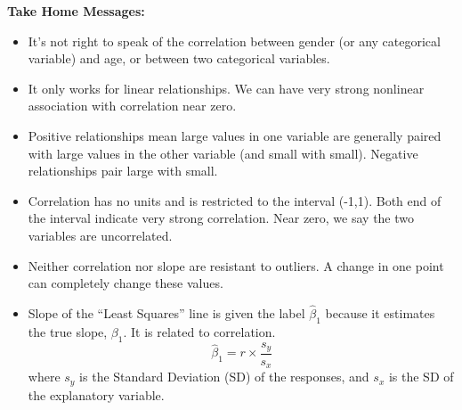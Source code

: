 \begin{center}
  {\bf Take Home Messages:}\vspace{-.4cm}
\end{center}
\begin{itemize}
\item It's not right to speak of the correlation between gender (or any
  categorical variable) and age, or between two categorical variables.
\item It only works for linear relationships.  We can have very strong
  nonlinear association with correlation near zero.
\item Positive relationships mean large values in one variable are
  generally  paired  with large values  in  the other variable
  (and small with small).  Negative relationships pair large with small.
\item Correlation has no units and is restricted to the interval
  (-1,1). Both end of the interval indicate very strong
  correlation. Near zero, we say the two variables are uncorrelated.

\item Neither correlation nor slope are resistant to outliers.  A
  change in one point can completely change these values.
\item Slope of the ``Least Squares'' line is given the label
  $\hat{\beta}_1$ because it estimates the true slope, $\beta_1$.  It is
  related to correlation.  
  $$  \hat{\beta}_1 = r \times\frac{s_y}{s_x}$$
  where $s_y$ is the Standard Deviation (SD) of the responses, and $s_x$ is
  the SD of the explanatory variable.
\end{itemize}



